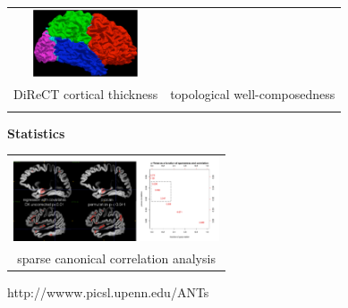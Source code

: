\documentclass[paperwidth=48in,paperheight=48in,portrait,final]{baposter}
\begin{document}
\begin{poster}
{\begin{center}
\begin{tabular}{cc}
\includegraphics[height=20mm]{glamglue.pdf} \\
DiReCT cortical thickness \cite{Das2009} & topological well-composedness \cite{Tustison2011} \\
\vspace{-1mm}\\
\end{tabular}
\end{center}

\begin{center}
{\bf Statistics}\\
\vspace{4mm}
\begin{tabular}{c}
\includegraphics[height=25mm]{MUvPSCCAN.pdf} \\
sparse canonical correlation analysis \cite{Avants2010b}
\end{tabular}
\end{center}

\smaller
\begin{center}
  http://wwww.picsl.upenn.edu/ANTs
\end{center}  

  }


\end{poster}
\end{document}
